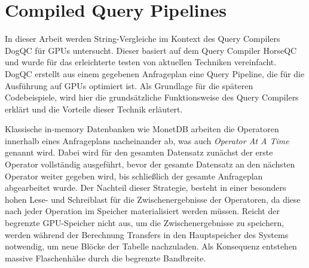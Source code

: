 \chapter{Compiled Query Pipelines}
\label{sec:pipelining}

In dieser Arbeit werden String-Vergleiche im Kontext des Query Compilers DogQC für GPUs untersucht.
Dieser basiert auf dem Query Compiler HorseQC \cite{Funke2018} und wurde für das erleichterte testen von aktuellen Techniken vereinfacht.
DogQC erstellt aus einem gegebenen Anfrageplan eine Query Pipeline, die für die Ausführung auf GPUs optimiert ist.
Als Grundlage für die späteren Codebeispiele, wird hier die grundsätzliche Funktionsweise des Query Compilers erklärt und die Vorteile dieser Technik erläutert.

Klassische in-memory Datenbanken wie MonetDB arbeiten die Operatoren innerhalb eines Anfrageplans nacheinander ab, was auch \emph{Operator At A Time} genannt wird.
Dabei wird für den gesamten Datensatz zunächst der erste Operator vollständig ausgeführt, bevor der gesamte Datensatz an den nächsten Operator weiter gegeben wird, bis schließlich der gesamte Anfrageplan abgearbeitet wurde.
Der Nachteil dieser Strategie, besteht in einer besonders hohen Lese- und Schreiblast für die Zwischenergebnisse der Operatoren, da diese nach jeder Operation im Speicher materialisiert werden müssen.
Reicht der begrenzte GPU-Speicher nicht aus, um die Zwischenergebnisse zu speichern, werden während der Berechnung Transfers in den Hauptspeicher des Systems notwendig, um neue Blöcke der Tabelle nachzuladen.
Als Konsequenz entstehen massive Flaschenhälse durch die begrenzte Bandbreite.


